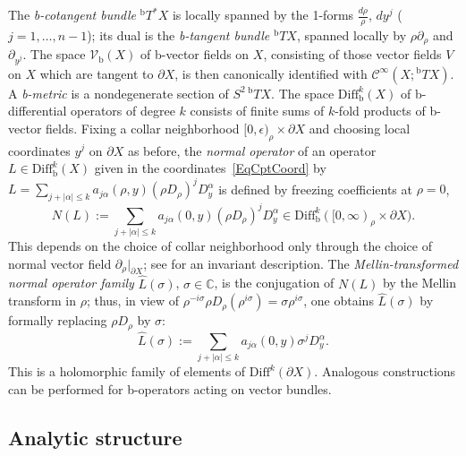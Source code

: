 \documentclass[reqno,11pt,letterpaper]{amsart}
\numberwithin{equation}{section}
\numberwithin{figure}{section}
\theoremstyle{definition}
\theoremstyle{remark}
\newcommand{\mc}{\mathcal}
\newcommand{\cC}{\mc C}
\newcommand{\C}{\mathbb{C}}
\newcommand{\eps}{\epsilon}
\newcommand{\pa}{\partial}
\newcommand{\wh}{\widehat}
\newcommand{\bop}{{\mathrm{b}}}
\newcommand{\Diff}{\mathrm{Diff}}
\newcommand{\Vf}{\mathcal V}
\newcommand{\Vb}{\Vf_\bop}
\newcommand{\Diffb}{\Diff_\bop}
\newcommand{\Tb}{{}^{\bop}T}
\newcommand{\CI}{\cC^\infty}
\begin{document}
The \emph{b-cotangent bundle} $\Tb^*X$ is locally spanned by the 1-forms $\frac{d\rho}{\rho}$, $d y^j$ ($j=1,\ldots,n-1$); its dual is the \emph{b-tangent bundle} $\Tb X$, spanned locally by $\rho\pa_\rho$ and $\pa_{y^j}$. The space $\Vb(X)$ of b-vector fields on $X$, consisting of those vector fields $V$ on $X$ which are tangent to $\pa X$, is then canonically identified with $\CI(X;\Tb X)$. A \emph{b-metric} is a nondegenerate section of $S^2\,\Tb X$. The space $\Diffb^k(X)$ of b-differential operators of degree $k$ consists of finite sums of $k$-fold products of b-vector fields. Fixing a collar neighborhood $[0,\eps)_\rho\times\pa X$ and choosing local coordinates $y^j$ on $\pa X$ as before, the \emph{normal operator} of an operator $L\in\Diffb^k(X)$ given in the coordinates~\eqref{EqCptCoord} by $L=\sum_{j+|\alpha|\leq k} a_{j\alpha}(\rho,y)(\rho D_\rho)^j D_y^\alpha$ is defined by freezing coefficients at $\rho=0$,
\begin{equation}
\label{EqCptNormOp}
  N(L) := \sum_{j+|\alpha|\leq k} a_{j\alpha}(0,y)(\rho D_\rho)^j D_y^\alpha \in \Diffb^k([0,\infty)_\rho\times\pa X).
\end{equation}
This depends on the choice of collar neighborhood only through the choice of normal vector field $\pa_\rho|_{\pa X}$; see \cite[\S4.15]{MelroseAPS} for an invariant description. The \emph{Mellin-transformed normal operator family} $\wh{L}(\sigma)$, $\sigma\in\C$, is the conjugation of $N(L)$ by the Mellin transform in $\rho$; thus, in view of $\rho^{-i\sigma}\rho D_\rho(\rho^{i\sigma})=\sigma\rho^{i\sigma}$, one obtains $\wh{L}(\sigma)$ by formally replacing $\rho D_\rho$ by $\sigma$:
\[
  \wh{L}(\sigma) := \sum_{j+|\alpha|\leq k} a_{j\alpha}(0,y)\sigma^j D_y^\alpha.
\]
This is a holomorphic family of elements of $\Diff^k(\pa X)$. Analogous constructions can be performed for b-operators acting on vector bundles.


\subsection{Analytic structure}
\label{SsCptA}
\end{document}
